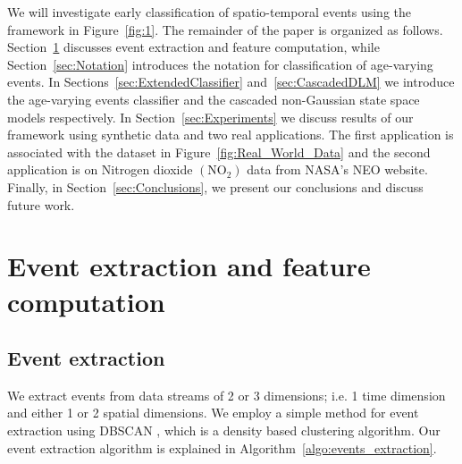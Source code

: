 \documentclass[a4paper,11pt]{article}
\begin{document}
We will investigate early classification of spatio-temporal events using the framework in Figure~\ref{fig:1}. The remainder of the paper is organized as follows. Section~\ref{sec:EventExtract} discusses event extraction and feature computation, while Section~\ref{sec:Notation} introduces the notation for classification of age-varying events. In Sections~\ref{sec:ExtendedClassifier} and~\ref{sec:CascadedDLM} we introduce the age-varying events classifier and the cascaded non-Gaussian state space models respectively. %
In Section~\ref{sec:Experiments} we discuss results of our framework using synthetic data and two real applications. The first application is associated with the dataset in Figure~\ref{fig:Real_World_Data} and the second application is on Nitrogen dioxide $(\text{NO}_2)$ data from NASA's NEO \cite{OMINO2} website. Finally, in Section~\ref{sec:Conclusions}, we present our conclusions and discuss future work.

\section{Event extraction and feature computation} \label{sec:EventExtract}

\subsection{Event extraction}

We extract events from data streams of 2 or 3 dimensions; i.e. 1 time dimension and either 1 or 2 spatial dimensions. We employ a simple method for event extraction using DBSCAN \cite{ester1996density}, which is a density based clustering algorithm. Our event extraction algorithm is explained in Algorithm~\ref{algo:events_extraction}.
\end{document}
